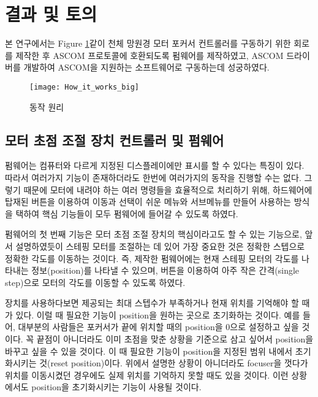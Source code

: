 \section{결과 및 토의}

본 연구에서는 Figure \ref{fig:How_it_works_big}\과 같이 천체 망원경 모터 포커서 컨트롤러를 구동하기 위한 회로를 제작한 후 ASCOM 프로토콜에 호환되도록 펌웨어를 제작하였고, ASCOM 드라이버를 개발하여 ASCOM을 지원하는 소프트웨어로 구동하는데 성궁하였다.

\begin{figure}[h]
	\begin{center}
		\texttt{[image: How\_it\_works\_big]}
		\caption{동작 원리}
		\label{fig:How_it_works_big}
	\end{center}
\end{figure}

\subsection{모터 초점 조절 장치 컨트롤러 및 펌웨어}

펌웨어는 컴퓨터와 다르게 지정된 디스플레이에만 표시를 할 수 있다는 특징이 있다. 따라서 여러가지 기능이 존재하더라도 한번에 여러가지의 동작을 진행할 수는 없다. 그렇기 때문에 모터에 내려야 하는 여러 명령들을 효율적으로 처리하기 위해, 하드웨어에 탑재된 버튼을 이용하여 이동과 선택이 쉬운 메뉴와 서브메뉴를 만들어 사용하는 방식을 택하여 핵심 기능들이 모두 펌웨어에 들어갈 수 있도록 하였다.

펌웨어의 첫 번째 기능은 모터 초점 조절 장치의 핵심이라고도 할 수 있는 기능으로, 앞서 설명하였듯이 스테핑 모터를 조절하는 데 있어 가장 중요한 것은 정확한 스텝으로 정확한 각도를 이동하는 것이다. 즉, 제작한 펌웨어에는 현재 스테핑 모터의 각도를 나타내는 정보(position)를 나타낼 수 있으며, 버튼을 이용하여 아주 작은 간격(single step)으로 모터의 각도를 이동할 수 있도록 하였다.

장치를 사용하다보면 제공되는 최대 스텝수가 부족하거나 현재 위치를 기억해야 할 때가 있다. 이럴 때 필요한 기능이 position을 원하는 곳으로 초기화하는 것이다. 예를 들어, 대부분의 사람들은 포커서가 끝에 위치할 때의 position을 0으로 설정하고 싶을 것이다. 꼭 끝점이 아니더라도 이미 초점을 맞춘 상황을 기준으로 삼고 싶어서 position을 바꾸고 싶을 수 있을 것이다. 이 때 필요한 기능이 position을 지정된 범위 내에서 초기화시키는 것(reset position)이다. 위에서 설명한 상황이 아니더라도 focuser을 껏다가 위치를 이동시켰던 경우에도 실제 위치를 기억하지 못할 때도 있을 것이다. 이런 상황에서도 position을 초기화시키는 기능이 사용될 것이다.

